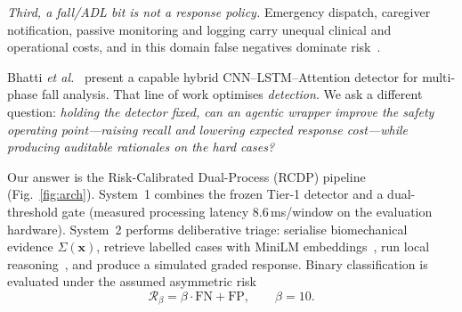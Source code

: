 \documentclass[journal]{IEEEtran}
\begin{document}
\emph{Third, a fall/ADL bit is not a response policy.} Emergency dispatch, caregiver notification, passive monitoring and logging carry unequal clinical and operational costs, and in this domain false negatives dominate risk~\cite{elkan2001foundations,noury2008evaluation}.

Bhatti \textit{et al.}~\cite{bhatti2025beyond} present a capable hybrid CNN--LSTM--Attention detector for multi-phase fall analysis. That line of work optimises \emph{detection}. We ask a different question: \emph{holding the detector fixed, can an agentic wrapper improve the safety operating point---raising recall and lowering expected response cost---while producing auditable rationales on the hard cases?}

Our answer is the Risk-Calibrated Dual-Process (RCDP) pipeline (Fig.~\ref{fig:arch}). System~1 combines the frozen Tier-1 detector and a dual-threshold gate (measured processing latency $8.6$\,ms/window on the evaluation hardware). System~2 performs deliberative triage: serialise biomechanical evidence $\Sigma(\mathbf{x})$, retrieve labelled cases with MiniLM embeddings~\cite{minilm2020,lewis2020rag}, run local reasoning~\cite{wei2022cot,yao2023react,ollama,mistral2023}, and produce a simulated graded response. Binary classification is evaluated under the assumed asymmetric risk
\begin{equation}
\mathcal{R}_\beta = \beta\cdot\mathrm{FN}+\mathrm{FP},\qquad \beta=10.
\label{eq:risk}
\end{equation}
\end{document}
